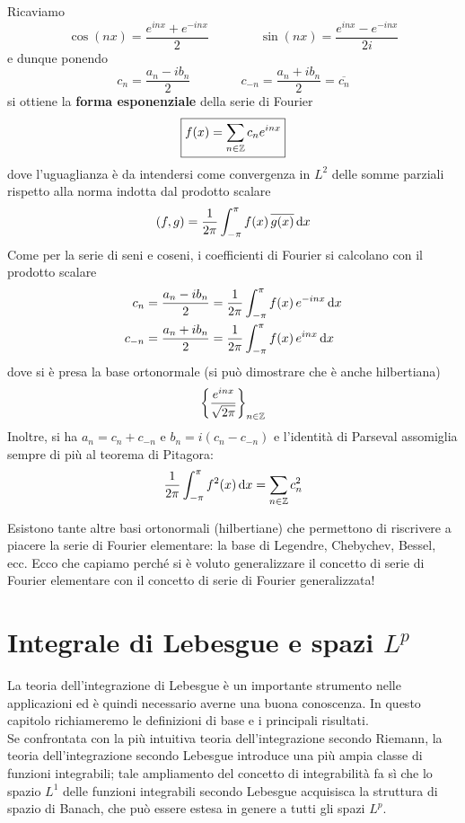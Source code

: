 Ricaviamo
\begin{equation*}
\cos(nx) = \frac{e^{inx} + e^{- inx}}{2}\qquad \qquad \sin(nx) = \frac{e^{inx} - e^{- inx}}{2i}
\end{equation*}
e dunque ponendo
\begin{equation*}
c_n=\frac{a_n-ib_n}{2}\qquad \qquad c_{-n}=\frac{a_n+ib_n}{2}=\overline{c_n}
\end{equation*}
si ottiene la \textbf{forma esponenziale} della serie di Fourier
\begin{equation*}
\boxed{f(x) = \sum\limits_{n\in\mathbb{Z}} c_{n} e^{inx}}
\end{equation*}
dove l'uguaglianza è da intendersi come convergenza in $L^2$ delle somme parziali rispetto alla norma indotta dal prodotto scalare
$$
(f, g) = \frac{1}{2\pi}\int^{\pi}_{- \pi} f(x)\,\overline{g(x)} \, \mathrm{d} x
$$
Come per la serie di seni e coseni, i coefficienti di Fourier si calcolano con il prodotto scalare
\begin{align*}
c_{n} &=\frac{a_n-ib_n}{2}=\frac{1}{2\pi}\int^{\pi}_{- \pi} f(x)\, e^{- inx} \, \mathrm{d} x \\
c_{-n} &=\frac{a_n+ib_n}{2} =\frac{1}{2\pi}\int^{\pi}_{- \pi} f(x)\, e^{ inx} \, \mathrm{d} x
\end{align*}
dove si è presa la base ortonormale (si può dimostrare che è anche hilbertiana)
$$
\left\{\frac{e^{inx}}{\sqrt{2\pi}}  \right\}_{n\in\mathbb{Z}}
$$
Inoltre, si ha $a_n=c_n+c_{-n}$ e $b_n=i(c_n-c_{-n})$ e l'identità di Parseval assomiglia sempre di più al teorema di Pitagora:
$$
\frac{1}{2\pi}\int^{\pi}_{- \pi} f^2(x) \, \mathrm{d} x =\sum_{n\in\mathbb{Z}} c_n^2
$$
\begin{rem}
Esistono tante altre basi ortonormali (hilbertiane) che permettono di riscrivere a piacere la serie di Fourier elementare: la base di Legendre, Chebychev, Bessel, ecc. Ecco che capiamo perché si è voluto generalizzare il concetto di serie di Fourier elementare con il concetto di serie di Fourier generalizzata!
\end{rem}


\chapter{Integrale di Lebesgue e spazi \texorpdfstring{$L^p$}{C}}

La teoria dell'integrazione di Lebesgue è un importante strumento nelle applicazioni ed è quindi necessario averne una buona conoscenza. In questo capitolo richiameremo le definizioni di base e i principali risultati.\\
Se confrontata con la più intuitiva teoria dell'integrazione secondo Riemann, la teoria dell'integrazione secondo Lebesgue introduce una più ampia classe di funzioni integrabili; tale ampliamento del concetto di integrabilità fa sì che lo spazio $L^1$ delle funzioni integrabili secondo Lebesgue acquisisca la struttura di spazio di Banach, che può essere estesa in genere a tutti gli spazi $L^p$.

